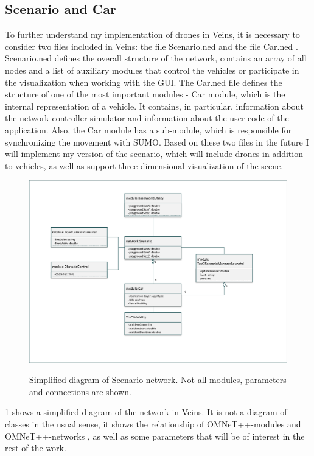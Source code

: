 \documentclass[]{nsm-thesis}
\begin{document}
\subsection {Scenario and Car}
\label{sec:scenarioned}

To further understand my implementation of drones in Veins, it is necessary to consider two files included in Veins: the file Scenario.ned \cite{scenarioned} and the file Car.ned \cite{carned}. Scenario.ned defines the overall structure of the network, contains an array of all nodes and a list of auxiliary modules that control the vehicles or participate in the visualization when working with the GUI. The Car.ned file defines the structure of one of the most important modules - Car module, which is the internal representation of a vehicle. It contains, in particular, information about the network controller simulator and information about the user code of the application. Also, the Car module has a sub-module, which is responsible for synchronizing the movement with SUMO. Based on these two files in the future I will implement my version of the scenario, which will include drones in addition to vehicles, as well as support three-dimensional visualization of the scene. 

\begin{figure}
  	\caption{Simplified diagram of Scenario \cite{scenarioned} network. Not all modules, parameters and connections are shown.}
	\centering
	\includegraphics[width=1\textwidth]{figures/Scenario.pdf}
	\label{fig:scenarioned}
\end{figure}

\cref{fig:scenarioned} shows a simplified diagram of the network in Veins. It is not a diagram of classes in the usual sense, it shows the relationship of OMNeT++-modules and OMNeT++-networks , as well as some parameters that will be of interest in the rest of the work. 
\end{document}

